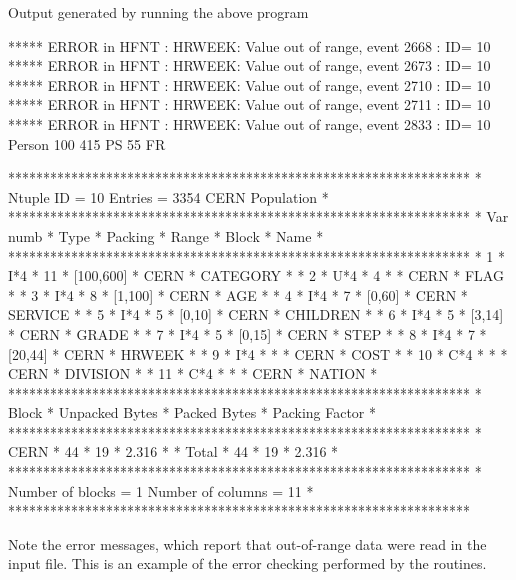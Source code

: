 \newpage

\begin{XMPt}{Output generated by running the above program}        

 ***** ERROR in HFNT : HRWEEK: Value out of range, event     2668 : ID=      10 
 ***** ERROR in HFNT : HRWEEK: Value out of range, event     2673 : ID=      10 
 ***** ERROR in HFNT : HRWEEK: Value out of range, event     2710 : ID=      10 
 ***** ERROR in HFNT : HRWEEK: Value out of range, event     2711 : ID=      10 
 ***** ERROR in HFNT : HRWEEK: Value out of range, event     2833 : ID=      10 
 Person 100 415 PS    55 FR  


 ******************************************************************
 * Ntuple ID = 10     Entries = 3354      CERN Population         *
 ******************************************************************
 * Var numb * Type * Packing *    Range     *  Block   *  Name    *
 ******************************************************************
 *      1   * I*4  *    11   * [100,600]    * CERN     * CATEGORY *
 *      2   * U*4  *    4    *              * CERN     * FLAG     *
 *      3   * I*4  *    8    * [1,100]      * CERN     * AGE      *
 *      4   * I*4  *    7    * [0,60]       * CERN     * SERVICE  *
 *      5   * I*4  *    5    * [0,10]       * CERN     * CHILDREN *
 *      6   * I*4  *    5    * [3,14]       * CERN     * GRADE    *
 *      7   * I*4  *    5    * [0,15]       * CERN     * STEP     *
 *      8   * I*4  *    7    * [20,44]      * CERN     * HRWEEK   *
 *      9   * I*4  *         *              * CERN     * COST     *
 *     10   * C*4  *         *              * CERN     * DIVISION *
 *     11   * C*4  *         *              * CERN     * NATION   *
 ******************************************************************
 *  Block   * Unpacked Bytes * Packed Bytes *   Packing Factor    *
 ******************************************************************
 * CERN     *    44          *    19        *    2.316            *
 * Total    *    44          *    19        *    2.316            *
 ******************************************************************
 * Number of blocks = 1     Number of columns = 11                *
 ******************************************************************
\label{lis:Ntupletabcreation}
\end{XMPt}

\bigskip

Note the  error messages, which report that out-of-range
data were read in the input file.
This is an example of the error checking performed by
the \CWN{} routines.


